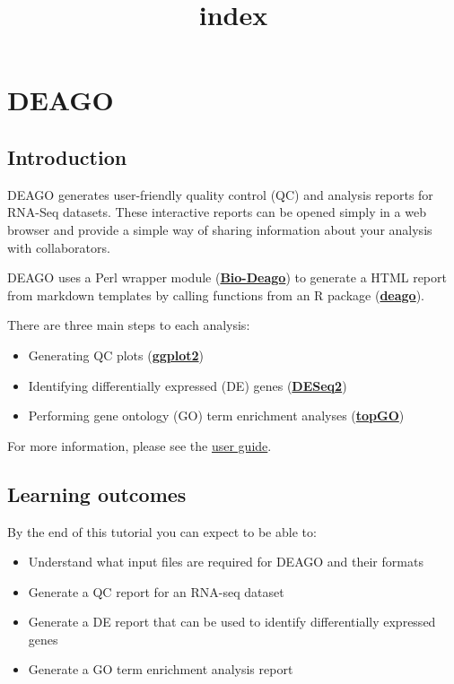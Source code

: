 \documentclass[11pt]{article}
\title{index}
\providecommand{\tightlist}{%
      \setlength{\itemsep}{0pt}\setlength{\parskip}{0pt}}
\begin{document}
    \hypertarget{deago}{%
\section{DEAGO}\label{deago}}

\hypertarget{introduction}{%
\subsection{Introduction}\label{introduction}}

DEAGO generates user-friendly quality control (QC) and analysis reports
for RNA-Seq datasets. These interactive reports can be opened simply in
a web browser and provide a simple way of sharing information about your
analysis with collaborators.

DEAGO uses a Perl wrapper module
(\textbf{\href{https://github.com/sanger-pathogens/Bio-Deago}{Bio-Deago}})
to generate a HTML report from markdown templates by calling functions
from an R package
(\textbf{\href{https://github.com/sanger-pathogens/deago}{deago}}).

There are three main steps to each analysis:

\begin{itemize}
\tightlist
\item
  Generating QC plots (\textbf{\href{http://ggplot2.org/}{ggplot2}})
\item
  Identifying differentially expressed (DE) genes
  (\textbf{\href{https://bioconductor.org/packages/release/bioc/html/DESeq2.html}{DESeq2}})
\item
  Performing gene ontology (GO) term enrichment analyses
  (\textbf{\href{http://bioconductor.org/packages/release/bioc/html/topGO.html}{topGO}})
\end{itemize}

For more information, please see the
\href{https://github.com/sanger-pathogens/Bio-Deago/blob/master/user_guide/index.ipynb}{user
guide}.

\hypertarget{learning-outcomes}{%
\subsection{Learning outcomes}\label{learning-outcomes}}

By the end of this tutorial you can expect to be able to:

\begin{itemize}
\tightlist
\item
  Understand what input files are required for DEAGO and their formats
\item
  Generate a QC report for an RNA-seq dataset
\item
  Generate a DE report that can be used to identify differentially
  expressed genes
\item
  Generate a GO term enrichment analysis report
\end{itemize}
\end{document}
